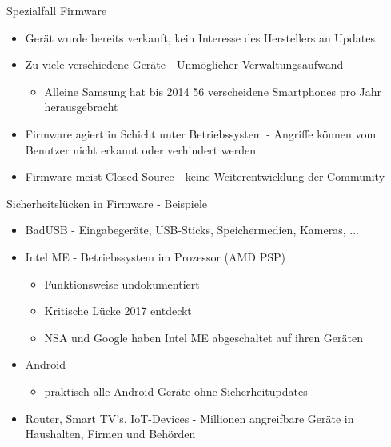 \documentclass[10pt]{beamer}
\begin{document}
\begin{frame}[fragile]{Spezialfall Firmware}
  \begin{itemize}
    \item Ger\"at wurde bereits verkauft, kein Interesse des Herstellers an Updates
    \item Zu viele verschiedene Ger\"ate - Unm\"oglicher Verwaltungsaufwand
      \begin{itemize}
        \item Alleine Samsung hat bis 2014 56 verscheidene Smartphones pro Jahr herausgebracht
      \end{itemize}
    \item Firmware agiert in Schicht unter Betriebssystem - Angriffe k\"onnen vom Benutzer nicht erkannt oder verhindert werden
    \item Firmware meist Closed Source - keine Weiterentwicklung der Community
  \end{itemize}
\end{frame}

\begin{frame}[fragile]{Sicherheitsl\"ucken in Firmware - Beispiele}
  \begin{itemize}
    \item BadUSB - Eingabeger\"ate, USB-Sticks, Speichermedien, Kameras, ...
    \item Intel ME - Betriebssystem im Prozessor (AMD PSP)
      \begin{itemize}
        \item Funktionsweise undokumentiert
        \item Kritische L\"ucke 2017 entdeckt
        \item NSA und Google haben Intel ME abgeschaltet auf ihren Ger\"aten
      \end{itemize}
    \item Android
      \begin{itemize}
        \item praktisch alle Android Ger\"ate ohne Sicherheitupdates
      \end{itemize}
    \item Router, Smart TV's, IoT-Devices - Millionen angreifbare Ger\"ate in Haushalten, Firmen und Beh\"orden
  \end{itemize}
\end{frame}
\end{document}
